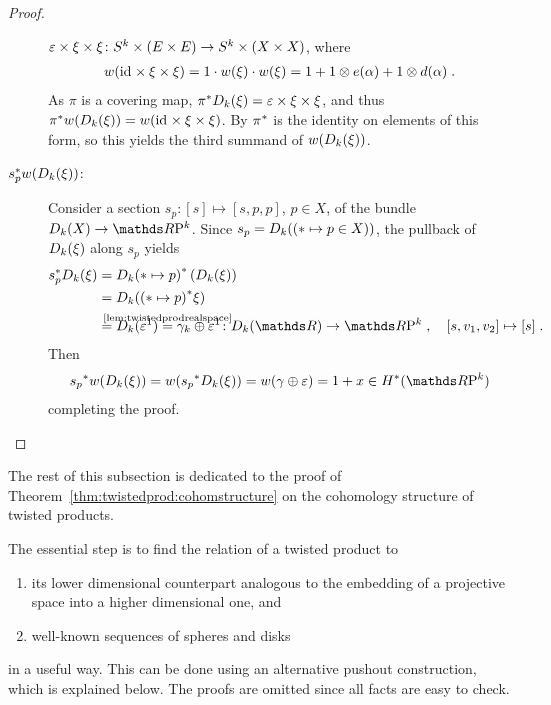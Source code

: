 \begin{Cor}
\begin{proof}
\begin{description}
      $\varepsilon\times\xi\times\xi\colon
      S^{k}\times(E\times E)\to S^{k}\times(X\times X)$, where
      \begin{gather*}
        {w}(\mathrm{id}_{}\times\xi\times\xi)
        = 1\cdot {w}(\xi)\cdot{w}(\xi)
        = 1 + 1\otimes e(\alpha) + 1\otimes d(\alpha)
        \;.
      \end{gather*}
      As $\pi$ is a covering map,
      ${\pi}^*D_{k}({\xi})=\varepsilon\times\xi\times\xi$,
      and thus
      ${\pi}^*{w}(D_{k}({\xi}))={w}(\mathrm{id}_{}\times\xi\times\xi)$.
      By  ${\pi}^*$ is the identity on
      elements of this form, so this yields the third
      summand of ${w}(D_{k}({\xi}))$.
    \item[${s}^*_p {w}(D_{k}({\xi}))$:]
      Consider a section $s_p\colon [s]\mapsto [s,p,p]$, $p\in X$, of
      the bundle $\Twistedprod k X\to\RP k$. Since
      $s_p=D_{k}({(\ast\mapsto p\in X)})$,
      the pullback of $D_{k}({\xi})$ along $s_p$ yields
      \begin{align*}
        \pb s_p\Twistedprod{k}{\xi}
        &= \pb{\Twistedprod{k}{\ast\mapsto p}}
          \left(\Twistedprod{k}{\xi}\right) \\
        &= \Twistedprod{k}{\pb{(\ast\mapsto p)}\xi} \\
        &= \Twistedprod{k}{\trivbdl^1}
          \cequalsby{\ref{lem:twistedprodrealspace}}
          \gamma_k\oplus\trivbdl^1
          \colon
          \Twistedprod{k}{\R} \to \RP k\;,\quad
          [s, v_1,v_2] \mapsto [s]
          \;.
      \end{align*}
      Then
      \begin{gather*}
        \pb{s_p}\W{\Twistedprod{k}{\xi}}
        = \W{\pb{s_p}\Twistedprod{k}{\xi}}
        = \W{\gamma\oplus\trivbdl}
        = 1+x\in\H^*(\RP k)
      \end{gather*}
      completing the proof.
      \qedhere
    \end{description}
  \end{proof}
\end{Cor}

The rest of this subsection is dedicated to the proof of
Theorem~\ref{thm:twistedprod:cohomstructure} on the cohomology
structure of twisted products.

The essential step is to find the relation of a twisted product to
\begin{enumerate}[1.]
\item its lower dimensional counterpart analogous to the embedding of
  a projective space into a higher dimensional one, and
\item well-known sequences of spheres and disks
\end{enumerate}
in a useful way.
This can be done using an alternative pushout construction, which is
explained below. The proofs are omitted since all facts are easy to
check.

